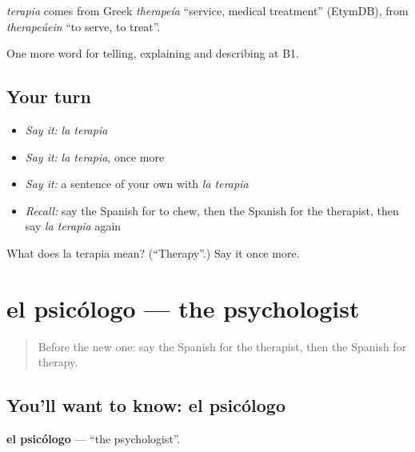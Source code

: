 \begin{cousinweb}
\emph{terapia} comes from Greek \emph{therapeía} \textquotedblleft{}service, medical treatment\textquotedblright{} (EtymDB), from \emph{therapeúein} \textquotedblleft{}to serve, to treat\textquotedblright{}.
\end{cousinweb}

\begin{grammarlens}[title={What you've built}]
One more word for telling, explaining and describing at B1.
\end{grammarlens}

\subsection*{Your turn}
\begin{itemize}
\raggedright
  \item \emph{Say it:} \emph{la terapia}
  \item \emph{Say it:} \emph{la terapia}, once more
  \item \emph{Say it:} a sentence of your own with \emph{la terapia}
  \item \emph{Recall:} say the Spanish for to chew, then the Spanish for the therapist, then say \emph{la terapia} again
\end{itemize}

\begin{tcolorbox}[breakable,colback=teal!4,colframe=teal!35!black,title={Before you move on}]
What does la terapia mean? (\textquotedblleft{}Therapy\textquotedblright{}.) Say it once more.
\end{tcolorbox}
\section[el psicólogo]{el psicólogo — the psychologist}

\label{lesson:ES-C743-psicologo}



\begin{quote}
Before the new one: say the Spanish for the therapist, then the Spanish for therapy.
\end{quote}

\subsection*{You'll want to know: el psicólogo}
\textbf{el psicólogo} — \textquotedblleft{}the psychologist\textquotedblright{}.

